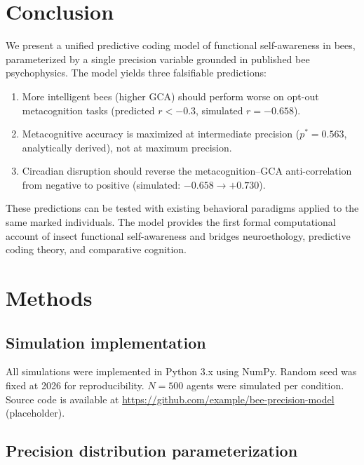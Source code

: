 \documentclass[12pt]{article}
\newcommand{\pstar}{p^*}
\begin{document}
\section{Conclusion}
\label{sec:conclusion}

We present a unified predictive coding model of functional self-awareness in bees, parameterized
by a single precision variable grounded in published bee psychophysics. The model yields three
falsifiable predictions:

\begin{enumerate}
  \item More intelligent bees (higher GCA) should perform worse on opt-out metacognition tasks
    (predicted $r < -0.3$, simulated $r = -0.658$).
  \item Metacognitive accuracy is maximized at intermediate precision ($\pstar = 0.563$,
    analytically derived), not at maximum precision.
  \item Circadian disruption should reverse the metacognition--GCA anti-correlation from negative
    to positive (simulated: $-0.658 \to +0.730$).
\end{enumerate}

These predictions can be tested with existing behavioral paradigms applied to the same marked
individuals. The model provides the first formal computational account of insect functional
self-awareness and bridges neuroethology, predictive coding theory, and comparative cognition.

\section*{Methods}
\label{sec:methods}

\subsection*{Simulation implementation}

All simulations were implemented in Python 3.x using NumPy. Random seed was fixed at 2026 for
reproducibility. $N = 500$ agents were simulated per condition. Source code is available at
\url{https://github.com/example/bee-precision-model} (placeholder).

\subsection*{Precision distribution parameterization}
\end{document}

